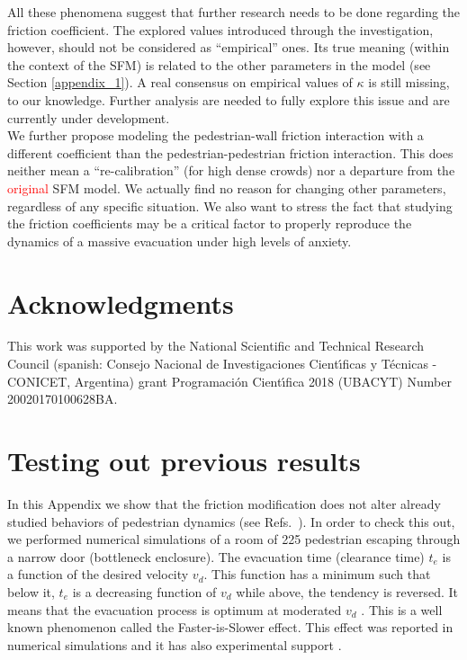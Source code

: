 \documentclass[preprint,12pt]{elsarticle}
\begin{document}
All these phenomena suggest that further research needs to be  
done regarding the friction coefficient. The explored values 
introduced through the investigation, however, should not be considered as 
``empirical'' ones. Its true meaning (within the context of the SFM) is related 
to the other parameters in the model (see Section \ref{appendix_1}). A real consensus 
on empirical values of $\kappa$ is still missing, to our knowledge. Further analysis are needed to fully explore this issue and are currently under development. \\


We further propose modeling the pedestrian-wall friction 
interaction with a different coefficient than the pedestrian-pedestrian friction 
interaction. This does neither mean a ``re-calibration'' (for 
high dense crowds) nor a departure from the \textcolor{red}{original} SFM model. 
We actually find no reason for changing other parameters, regardless of any 
specific situation. We also want to stress the fact that studying the friction 
coefficients may be a critical factor to properly reproduce the dynamics of a 
massive evacuation under high levels of anxiety. 
\\  

\section*{Acknowledgments}
This work was supported by the National Scientific and Technical 
Research Council (spanish: Consejo Nacional de Investigaciones Cient\'\i ficas 
y T\'ecnicas - CONICET, Argentina) grant Programaci\'on Cient\'\i fica 2018 (UBACYT) Number 20020170100628BA.

\appendix



\section{\label{appendix_3} Testing out previous results}


In this Appendix we show that the friction modification does not alter already studied behaviors of pedestrian dynamics (see Refs.~\cite{Dorso1,Dorso2,Dorso3}). In order to check this out, we performed numerical simulations of a room of 225 pedestrian escaping through a narrow door (bottleneck enclosure). The evacuation time (clearance time) $t_e$ is a function of the desired velocity $v_d$. This function has a minimum such that below it, $t_e$ is a decreasing function of $v_d$ while above, the tendency is reversed. It means that the evacuation process is optimum at moderated $v_d$ . This is a well known phenomenon called the Faster-is-Slower effect. This effect was reported in numerical simulations \cite{Dorso1,Dorso5} and it has also experimental support \cite{parisi1}. \\
\end{document}

